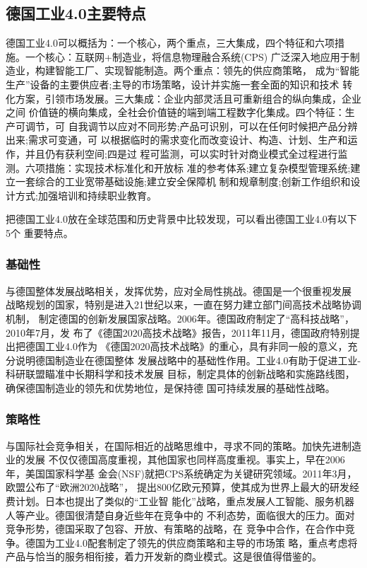 \documentclass[11pt]{ctexart}
\begin{document}
{{{{\subsection{德国工业4.0主要特点}
\label{sec:orga040586}

德国工业4.0可以概括为：一个核心，两个重点，三大集成，四个特征和六项措施。一个核心：互联网+制造业，将信息物理融合系统(CPS)
广泛深入地应用于制造业，构建智能工厂、实现智能制造。两个重点：领先的供应商策略，
成为“智能生产”设备的主要供应者;主导的市场策略，设计并实施一套全面的知识和技术
转化方案，引领市场发展。三大集成：企业内部灵活且可重新组合的纵向集成，企业之间
价值链的横向集成，全社会价值链的端到端工程数字化集成。四个特征：生产可调节，可
自我调节以应对不同形势;产品可识别，可以在任何时候把产品分辨出来;需求可变通，可
以根据临时的需求变化而改变设计、构造、计划、生产和运作，并且仍有获利空间;四是过
程可监测，可以实时针对商业模式全过程进行监测。六项措施：实现技术标准化和开放标
准的参考体系;建立复杂模型管理系统;建立一套综合的工业宽带基础设施;建立安全保障机
制和规章制度;创新工作组织和设计方式;加强培训和持续职业教育。

把德国工业4.0放在全球范围和历史背景中比较发现，可以看出德国工业4.0有以下5个
重要特点。

\subsubsection{基础性}
\label{sec:org9d50824}

与德国整体发展战略相关，发挥优势，应对全局性挑战。德国是一个很重视发展
战略规划的国家，特别是进入21世纪以来，一直在努力建立部门间高技术战略协调机制，
制定德国的创新发展国家战略。2006年。德国政府制定了“高科技战略”，2010年7月，发
布了《德国2020高技术战略》报告，2011年11月，德国政府特别提出把德国工业4.0作为
《德国2020高技术战略》的重心，具有非同一般的意义，充分说明德国制造业在德国整体
发展战略中的基础性作用。工业4.0有助于促进工业-科研联盟瞄准中长期科学和技术发展
目标，制定具体的创新战略和实施路线图，确保德国制造业的领先和优势地位，是保持德
国可持续发展的基础性战略。

\subsubsection{策略性}
\label{sec:org4362fc6}

与国际社会竞争相关，在国际相近的战略思维中，寻求不同的策略。加快先进制造业的发展
不仅仅德国高度重视，其他国家也同样高度重视。事实上，早在2006年，美国国家科学基
金会(NSF)就把CPS系统确定为关键研究领域。2011年3月，欧盟公布了“欧洲2020战略”，
提出800亿欧元预算，使其成为世界上最大的研发经费计划。日本也提出了类似的“工业智
能化”战略，重点发展人工智能、服务机器人等产业。德国很清楚自身近些年在竞争中的
不利态势，面临很大的压力。面对竞争形势，德国采取了包容、开放、有策略的战略，在
竞争中合作，在合作中竞争。德国为工业4.0配套制定了领先的供应商策略和主导的市场策
略，重点考虑将产品与恰当的服务相衔接，着力开发新的商业模式。这是很值得借鉴的。

}}}}
\end{document}
